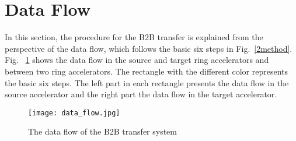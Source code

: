 \section{Data Flow}
\label{cpt_data}
In this section, the procedure for the B2B transfer is explained from the perspective of the data flow, which follows the basic six steps in Fig.~\ref{2method}. Fig. ~\ref{data_flow} shows the data flow in the source and target ring accelerators and between two ring accelerators. The rectangle with the different color represents the basic six steps. The left part in each rectangle presents the data flow in the source accelerator and the right part the data flow in the target accelerator.
\begin{figure}[H]
   \centering   
   \texttt{[image: data\_flow.jpg]}
   \caption{The data flow of the B2B transfer system}
   \label{data_flow}
\end{figure}  

